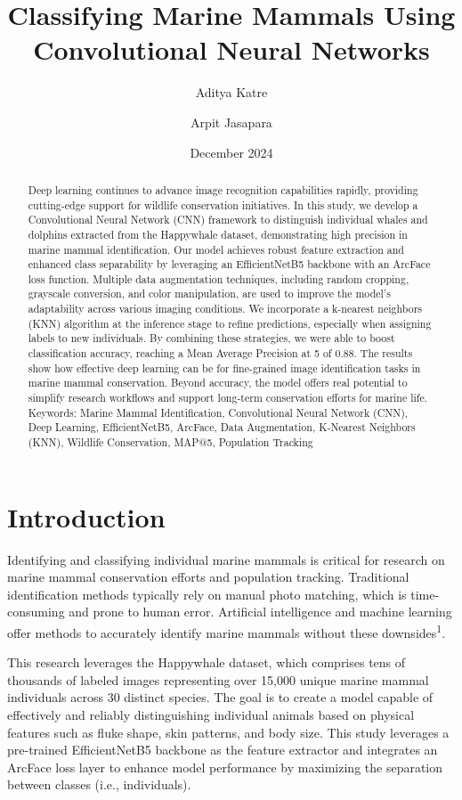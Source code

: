 \documentclass[twocolumn]{article}
\title{Classifying Marine Mammals Using Convolutional Neural Networks}
\author[1]{Aditya Katre}
\author[2]{Arpit Jasapara}
\affil[1]{Del Norte High, San Diego, California}
\affil[2]{University of California Los Angeles, Los Angeles, California}
\date{December 2024}
\begin{document}
\maketitle
\begin{abstract}
Deep learning continues to advance image recognition capabilities rapidly, providing cutting-edge support for wildlife conservation initiatives. In this study, we develop a Convolutional Neural Network (CNN) framework to distinguish individual whales and dolphins extracted from the Happywhale dataset, demonstrating high precision in marine mammal identification. Our model achieves robust feature extraction and enhanced class separability by leveraging an EfficientNetB5 backbone with an ArcFace loss function. Multiple data augmentation techniques, including random cropping, grayscale conversion, and color manipulation, are used to improve the model’s adaptability across various imaging conditions. We incorporate a k-nearest neighbors (KNN) algorithm at the inference stage to refine predictions, especially when assigning labels to new individuals. By combining these strategies, we were able to boost classification accuracy, reaching a Mean Average Precision at 5 of 0.88. The results show how effective deep learning can be for fine-grained image identification tasks in marine mammal conservation. Beyond accuracy, the model offers real potential to simplify research workflows and support long-term conservation efforts for marine life.
\newline
\newline
Keywords: Marine Mammal Identification, Convolutional Neural Network (CNN), Deep Learning, EfficientNetB5, ArcFace, Data Augmentation, K-Nearest Neighbors (KNN), Wildlife Conservation, MAP@5, Population Tracking
\end{abstract}

\section{Introduction}
Identifying and classifying individual marine mammals is critical for research on marine mammal conservation efforts and population tracking. Traditional identification methods typically rely on manual photo matching, which is time-consuming and prone to human error. Artificial intelligence and machine learning offer methods to accurately identify marine mammals without these downsides\textsuperscript{1}.

This research leverages the Happywhale dataset, which comprises tens of thousands of labeled images representing over 15,000 unique marine mammal individuals across 30 distinct species. The goal is to create a model capable of effectively and reliably distinguishing individual animals based on physical features such as fluke shape, skin patterns, and body size. This study leverages a pre-trained EfficientNetB5 backbone as the feature extractor and integrates an ArcFace loss layer to enhance model performance by maximizing the separation between classes (i.e., individuals).
\end{document}
